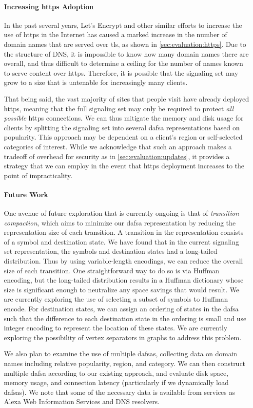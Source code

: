 \paragraph{Increasing \ac{https} Adoption}
In the past several years, Let's Encrypt and other similar efforts to increase
the use of \ac{https} in the Internet has caused a marked increase in the number
of domain names that are served over \ac{tls}, as shown in
\autoref{sec:evaluation:https}. Due to the structure of DNS, it is impossible to
know how many domain names there are overall, and thus difficult to determine a
ceiling for the number of names known to serve content over \ac{https}.
Therefore, it is possible that the signaling set may grow to a size that is
untenable for increasingly many clients.

That being said, the vast majority of sites that people visit have already
deployed \ac{https}, meaning that the full signaling set may only be required to
protect \emph{all possible} \ac{https} connections. We can thus mitigate the
memory and disk usage for clients by splitting the signaling set into several
\ac{dafsa} representations based on popularity. This approach may be dependent
on a client's region or self-selected categories of interest. While we
acknowledge that such an approach makes a tradeoff of overhead for security as
in \autoref{sec:evaluation:updates}, it provides a strategy that we can employ
in the event that \ac{https} deployment increases to the point of
impracticality.

\paragraph{Future Work}
One avenue of future exploration that is currently ongoing is that of
\emph{transition compaction}, which aims to minimize our \ac{dafsa}
representation by reducing the representation size of each transition. A
transition in the representation consists of a symbol and destination state. We
have found that in the current signaling set representation, the symbols and
destination states had a long-tailed distribution. Thus by using variable-length
encodings, we can reduce the overall size of each transition. One
straightforward way to do so is via Huffman encoding, but the long-tailed
distribution results in a Huffman dictionary whose size is significant enough to
neutralize any space savings that would result. We are currently exploring the
use of selecting a subset of symbols to Huffman encode. For destination states,
we can assign an ordering of states in the \ac{dafsa} such that the difference
to each destination state in the ordering is small and use integer encoding to
represent the location of these states. We are currently exploring the
possibility of vertex separators in graphs to address this problem.

We also plan to examine the use of multiple \acp{dafsa}, collecting data on
domain names including relative popularity, region, and category. We can then
construct multiple \ac{dafsa} according to our existing approach, and evaluate
disk space, memory usage, and connection latency (particularly if we dynamically
load \acp{dafsa}). We note that some of the necessary data is available from services
as Alexa Web Information Services and DNS resolvers.
